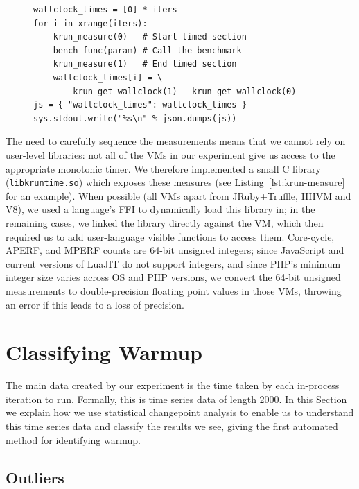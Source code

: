 \documentclass[preprint,numbers,10pt]{sigplanconf}
\begin{document}
\begin{figure}[t]
\begin{lstlisting}[label=lst:pyiter, caption={An elided version of the Python
in-process iterations runner (with core cycles etc. removed).}]
wallclock_times = [0] * iters
for i in xrange(iters):
    krun_measure(0)   # Start timed section
    bench_func(param) # Call the benchmark
    krun_measure(1)   # End timed section
    wallclock_times[i] = \
        krun_get_wallclock(1) - krun_get_wallclock(0)
js = { "wallclock_times": wallclock_times }
sys.stdout.write("%s\n" % json.dumps(js))
\end{lstlisting}
\end{figure}

The need to carefully sequence the measurements means that we cannot rely
on user-level libraries: not all of the VMs in our experiment give us access to
the appropriate monotonic timer. We therefore
implemented a small C library (\texttt{libkruntime.so}) which exposes these
measures (see Listing~\ref{lst:krun-measure} for an example). When possible
(all VMs apart from JRuby+Truffle, HHVM and V8), we used a language's FFI to dynamically load this library
in; in the remaining cases, we linked the library directly against the VM, which
then required us to add user-language visible functions to access them.
Core-cycle, APERF, and MPERF counts are 64-bit unsigned integers; since
JavaScript and current versions of LuaJIT do not support
integers, and since PHP's minimum integer size varies across OS and PHP versions, we
convert the 64-bit unsigned measurements to
double-precision floating point values in those VMs, throwing an error if this leads to a
loss of precision.


\section{Classifying Warmup}
\label{sec:stats}

The main data created by our experiment is the time taken by each in-process
iteration to run. Formally, this is time series data of length 2000. In
this Section we explain how we use statistical changepoint analysis to enable us to
understand this time series data and classify the results we see, giving the
first automated method for identifying warmup.


\subsection{Outliers}
\end{document}
